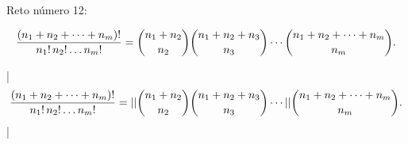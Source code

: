 

\bigskip

\enunciadoS Reto n\'umero 12:

$${(n_1+n_2+\cdots+n_m)!\over n_1!\,n_2!\dots n_m!}=
{n_1+n_2\choose n_2}{n_1+n_2+n_3\choose n_3}\cdots
{n_1+n_2+\cdots+n_m\choose n_m}.$$

\bigskip

\respuestaS

|$${(n_1+n_2+\cdots+n_m)!\over n_1!\,n_2!\dots n_m!}=|

|{n_1+n_2\choose n_2}{n_1+n_2+n_3\choose n_3}\cdots|

|{n_1+n_2+\cdots+n_m\choose n_m}.$$|

\bye


